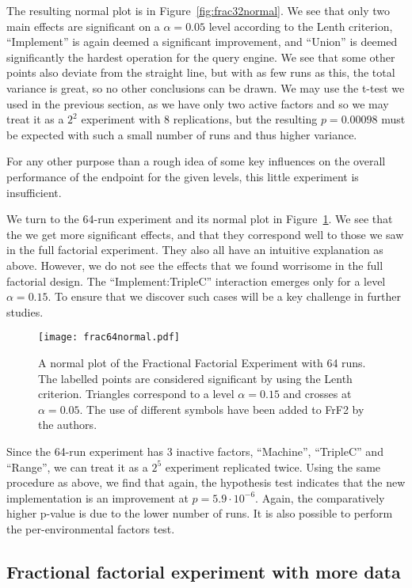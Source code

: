 \documentclass{llncs}
\begin{document}
The resulting normal plot is in Figure~\ref{fig:frac32normal}. We see
that only two main effects are significant on a $\alpha = 0.05$ level
according to the Lenth criterion, ``Implement'' is again deemed a
significant improvement, and ``Union'' is deemed significantly the
hardest operation for the query engine. We see that some other points
also deviate from the straight line, but with as few runs as this, the
total variance is great, so no other conclusions can be drawn. We may
use the t-test we used in the previous section, as we have only two
active factors and so we may treat it as a $2^2$ experiment with 8
replications, but the resulting $p = 0.00098$ must be expected with
such a small number of runs and thus higher variance.


For any other purpose than a rough idea of some key influences on the
overall performance of the endpoint for the given levels, this little
experiment is insufficient.

We turn to the 64-run experiment and its normal plot in
Figure~\ref{fig:frac64normal}. We see that the we get more significant
effects, and that they correspond well to those we saw in the full
factorial experiment. They also all have an intuitive explanation as
above. However, we do not see the effects that we found worrisome in
the full factorial design. The ``Implement:TripleC'' interaction
emerges only for a level $\alpha=0.15$. To ensure that we discover
such cases will be a key challenge in further studies.

\begin{figure}[ht]
  \texttt{[image: frac64normal.pdf]}
  \caption{A normal plot of the Fractional Factorial Experiment with
    64 runs. The labelled points are considered significant by using
    the Lenth criterion. Triangles correspond to a level $\alpha=0.15$
    and crosses at $\alpha=0.05$. The use of different symbols have
    been added to FrF2 by the authors.}\label{fig:frac64normal}
\end{figure}

Since the 64-run experiment has 3 inactive factors, ``Machine'',
``TripleC'' and ``Range'', we can treat it as a $2^5$ experiment
replicated twice. Using the same procedure as above, we find that
again, the hypothesis test indicates that the new implementation is an
improvement at $p = 5.9 \cdot 10^{-6}$. Again, the comparatively
higher p-value is due to the lower number of runs. It is also possible
to perform the per-environmental factors test.


\subsection{Fractional factorial experiment with more data}\label{sec:hugefrac}
\end{document}
